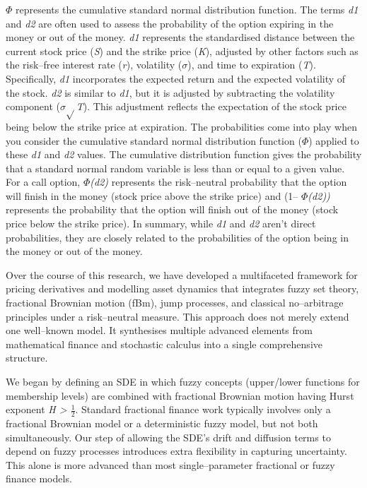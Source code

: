 \documentclass[12pt,a4paper]{report}
\numberwithin{equation}{section}
\begin{document}
\emph{$\Phi$} represents the cumulative standard normal distribution
function. The terms \emph{d1} and \emph{d2}\hspace{0pt} are often used
to assess the probability of the option expiring in the money or out of
the money. \emph{d1}\hspace{0pt} represents the standardised distance
between the current stock price (\emph{S}) and the strike price
(\emph{K}), adjusted by other factors such as the risk--free interest
rate (\emph{r}), volatility (\emph{$\sigma$}), and time to expiration
(\emph{T}). Specifically, \emph{d1} incorporates the expected return and
the expected volatility of the stock. \emph{d2} is similar to
\emph{d1}\hspace{0pt}, but it is adjusted by subtracting the volatility
component (\emph{$\sigma$$\sqrt{}$T\hspace{0pt}}). This adjustment reflects the
expectation of the stock price being below the strike price at
expiration. The probabilities come into play when you consider the
cumulative standard normal distribution function (\emph{$\Phi$}) applied to
these \emph{d1} and \emph{d2} values. The cumulative distribution
function gives the probability that a standard normal random variable is
less than or equal to a given value. For a call option, \emph{$\Phi$(d2)}
represents the risk--neutral probability that the option will finish in
the money (stock price above the strike price) and (1-- \emph{$\Phi$(d2))}
represents the probability that the option will finish out of the money
(stock price below the strike price). In summary, while
\emph{d1}\hspace{0pt} and \emph{d2}\hspace{0pt} aren't direct
probabilities, they are closely related to the probabilities of the
option being in the money or out of the money.

Over the course of this research, we have developed a multifaceted
framework for pricing derivatives and modelling asset dynamics that
integrates fuzzy set theory, fractional Brownian motion (fBm), jump
processes, and classical no--arbitrage principles under a risk--neutral
measure. This approach does not merely extend one well--known model. It
synthesises multiple advanced elements from mathematical finance and
stochastic calculus into a single comprehensive structure.

We began by defining an SDE in which fuzzy concepts (upper/lower
functions for membership levels) are combined with fractional Brownian
motion having Hurst exponent \emph{H \textgreater{} $\frac{1}{2}$}\hspace{0pt}.
Standard fractional finance work typically involves only a fractional
Brownian model or a deterministic fuzzy model, but not both
simultaneously. Our step of allowing the SDE's drift and diffusion terms
to depend on fuzzy processes introduces extra flexibility in capturing
uncertainty. This alone is more advanced than most single--parameter
fractional or fuzzy finance models.
\end{document}

